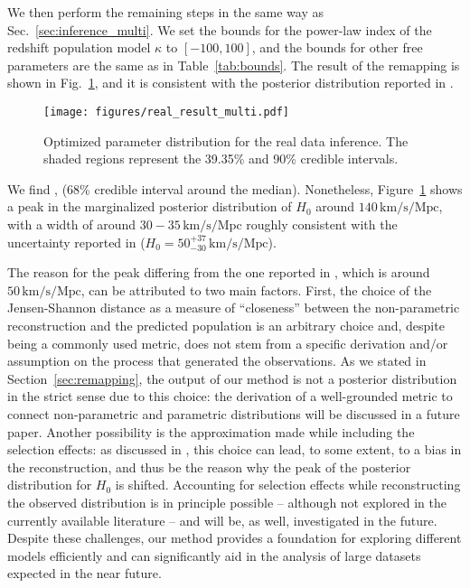 \documentclass[sn-aps, pdflatex, iicol]{sn-jnl}
\begin{document}
We then perform the remaining steps in the same way as Sec.~\ref{sec:inference_multi}.
We set the bounds for the power-law index of the redshift population model $\kappa$ to $[-100, 100]$, and the bounds for other free parameters are the same as in Table~\ref{tab:bounds}.
The result of the remapping is shown in Fig.~\ref{fig:real_result_multi}, and it is consistent with the posterior distribution reported in \cite{LIGOScientific:2021aug}.
\begin{figure}
    \texttt{[image: figures/real\_result\_multi.pdf]}
    \caption{
        Optimized parameter distribution for the real data inference.
        The shaded regions represent the 39.35\% and 90\% credible intervals.
    }
    \label{fig:real_result_multi}
\end{figure}
We find , (68\% credible interval around the median). Nonetheless, Figure~\ref{fig:real_result_multi} shows a peak in the marginalized posterior distribution of $H_0$ around $140\, \mathrm{km/s/Mpc}$, with a width of around $30-35\, \mathrm{km/s/Mpc}$ roughly consistent with the uncertainty reported in \cite{LIGOScientific:2021aug} ($H_0 = 50^{+37}_{-30} \, \mathrm{km/s/Mpc}$).

The reason for the peak differing from the one reported in \cite{LIGOScientific:2021aug}, which is around $50\, \mathrm{km/s/Mpc}$, can be attributed to two main factors.
First, the choice of the Jensen-Shannon distance as a measure of ``closeness'' between the non-parametric reconstruction and the predicted population is an arbitrary choice and, despite being a commonly used metric, does not stem from a specific derivation and/or assumption on the process that generated the observations.
As we stated in Section~\ref{sec:remapping}, the output of our method is not a posterior distribution in the strict sense due to this choice: the derivation of a well-grounded metric to connect non-parametric and parametric distributions will be discussed in a future paper.
Another possibility is the approximation made while including the selection effects: as discussed in \cite{Essick:2023upv}, this choice can lead, to some extent, to a bias in the reconstruction, and thus be the reason why the peak of the posterior distribution for $H_0$ is shifted.
Accounting for selection effects while reconstructing the observed distribution is in principle possible -- although not explored in the currently available literature -- and will be, as well, investigated in the future.
Despite these challenges, our method provides a foundation for exploring different models efficiently and can significantly aid in the analysis of large datasets expected in the near future.
\end{document}
